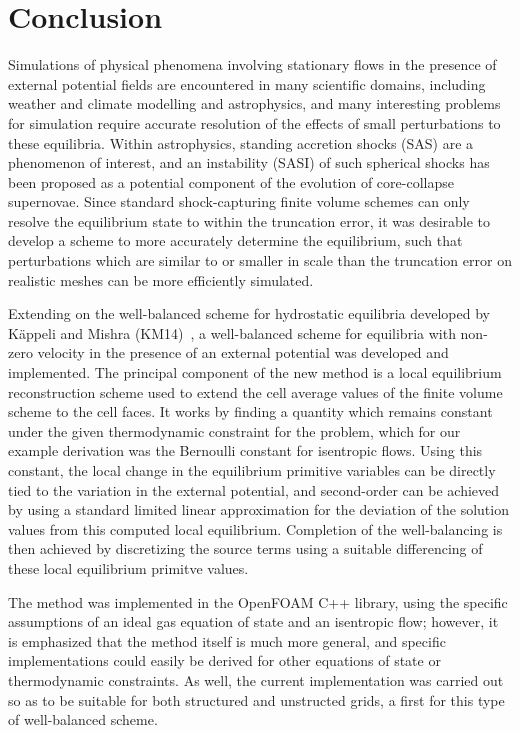 \chapter{Conclusion}
\label{chap:conclusion}

Simulations of physical phenomena involving stationary flows in the presence of external potential fields are encountered in many scientific domains, including weather and climate modelling and astrophysics, and many interesting problems for simulation require accurate resolution of the effects of small perturbations to these equilibria. Within astrophysics, standing accretion shocks (SAS) are a phenomenon of interest, and an instability (SASI) of such spherical shocks has been proposed as a potential component of the evolution of core-collapse supernovae. Since standard shock-capturing finite volume schemes can only resolve the equilibrium state to within the truncation error, it was desirable to develop a scheme to more accurately determine the equilibrium, such that perturbations which are similar to or smaller in scale than the truncation error on realistic meshes can be more efficiently simulated.

Extending on the well-balanced scheme for hydrostatic equilibria developed by Käppeli and Mishra (KM14)~\cite{Kappeli2014}, a well-balanced scheme for equilibria with non-zero velocity in the presence of an external potential was developed and implemented. The principal component of the new method is a local equilibrium reconstruction scheme used to extend the cell average values of the finite volume scheme to the cell faces. It works by finding a quantity which remains constant under the given thermodynamic constraint for the problem, which for our example derivation was the Bernoulli constant for isentropic flows. Using this constant, the local change in the equilibrium primitive variables can be directly tied to the variation in the external potential, and second-order can be achieved by using a standard limited linear approximation for the deviation of the solution values from this computed local equilibrium. Completion of the well-balancing is then achieved by discretizing the source terms using a suitable differencing of these local equilibrium primitve values.

The method was implemented in the OpenFOAM C++ library, using the specific assumptions of an ideal gas equation of state and an isentropic flow; however, it is emphasized that the method itself is much more general, and specific implementations could easily be derived for other equations of state or thermodynamic constraints. As well, the current implementation was carried out so as to be suitable for both structured and unstructed grids, a first for this type of well-balanced scheme.

